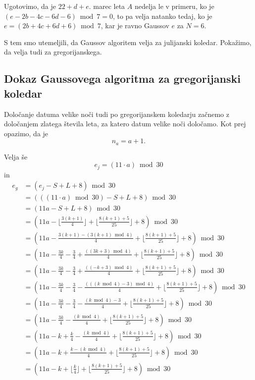 \documentclass[a4paper,12pt]{article}
\begin{document}
Ugotovimo, da je $22 + d + e$. marec leta $A$ nedelja le v primeru, ko je 
$(e - 2b - 4c - 6d - 6) \bmod 7 = 0$, to pa velja natanko tedaj, ko je
$e = (2b + 4c + 6d + 6) \bmod 7$, kar je ravno Gaussov $e$ za $N=6$.

S tem smo utemeljili, da Gaussov algoritem velja za julijanski koledar. 
Pokažimo, da velja tudi za gregorijanskega.


\subsection{Dokaz Gaussovega algoritma za gregorijanski koledar}

Določanje datuma velike noči tudi po gregorijanskem koledarju začnemo z določanjem zlatega 
števila leta, za katero datum velike noči določamo. Kot prej opazimo, da je $$n_a = a + 1.$$

Velja še $$e_j = (11 \cdot a) \bmod 30$$ in %
\begin{align*}
    e_g &= (e_j - S + L + 8) \bmod 30 \\
        &= (((11 \cdot a) \bmod 30) - S + L + 8) \bmod 30 \\
        &= (11a - S + L + 8) \bmod 30 \\
        &= \textstyle (11a - \lfloor \frac{3 (k + 1)}{4} \rfloor + \lfloor \frac{8 (k + 1) + 5}{25} \rfloor + 8) \bmod 30 \\
        &= \textstyle (11a - \frac{3 (k + 1) - (3 (k + 1) \bmod 4)}{4} + \lfloor \frac{8 (k + 1) + 5}{25} \rfloor + 8) \bmod 30 \\
        &= \textstyle (11a - \frac{3k}{4} - \frac{3}{4} + \frac{((3 k + 3) \bmod 4)}{4} + \lfloor \frac{8 (k + 1) + 5}{25} \rfloor + 8) \bmod 30 \\
        &= \textstyle (11a - \frac{3k}{4} - \frac{3}{4} + \frac{((-k + 3) \bmod 4)}{4} + \lfloor \frac{8 (k + 1) + 5}{25} \rfloor + 8) \bmod 30 \\
        &= \textstyle (11a - \frac{3k}{4} - \frac{3}{4} - \frac{(((k \bmod 4) - 3) \bmod 4)}{4} + \lfloor \frac{8 (k + 1) + 5}{25} \rfloor + 8) \bmod 30 \\
        &= \textstyle (11a - \frac{3k}{4} - \frac{3}{4} - \frac{(k \bmod 4) - 3}{4} + \lfloor \frac{8 (k + 1) + 5}{25} \rfloor + 8) \bmod 30 \\
        &= \textstyle (11a - \frac{3k}{4} - \frac{(k \bmod 4)}{4} + \lfloor \frac{8 (k + 1) + 5}{25} \rfloor + 8) \bmod 30 \\
        &= \textstyle (11a - k + \frac{k}{4} - \frac{(k \bmod 4)}{4} + \lfloor \frac{8 (k + 1) + 5}{25} \rfloor + 8) \bmod 30 \\
        &= \textstyle (11a - k + \frac{k - (k \bmod 4)}{4} + \lfloor \frac{8 (k + 1) + 5}{25} \rfloor + 8) \bmod 30 \\
        &= \textstyle (11a - k + \lfloor \frac{k}{4} \rfloor + \lfloor \frac{8 (k + 1) + 5}{25} \rfloor + 8) \bmod 30
\end{align*}
\end{document}

